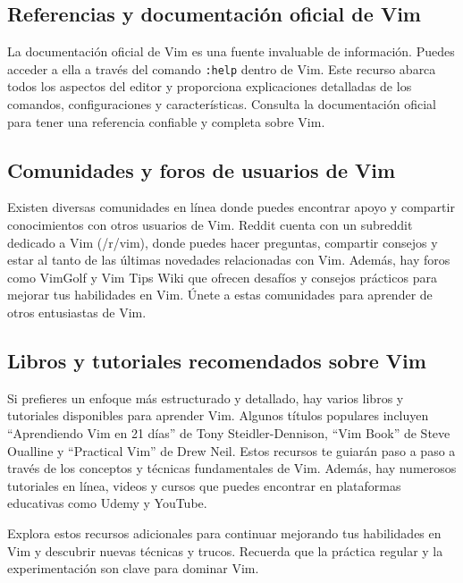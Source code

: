 \documentclass[
  doc,
  floatsintext,
  longtable,
  a4paper,
  nolmodern,
  notxfonts,
  notimes,
  colorlinks=true,linkcolor=blue,citecolor=blue,urlcolor=blue]{apa7}
\begin{document}
\subsection{Referencias y documentación oficial de
Vim}\label{referencias-y-documentaciuxf3n-oficial-de-vim}

La documentación oficial de Vim es una fuente invaluable de información.
Puedes acceder a ella a través del comando \texttt{:help} dentro de Vim.
Este recurso abarca todos los aspectos del editor y proporciona
explicaciones detalladas de los comandos, configuraciones y
características. Consulta la documentación oficial para tener una
referencia confiable y completa sobre Vim.

\subsection{Comunidades y foros de usuarios de
Vim}\label{comunidades-y-foros-de-usuarios-de-vim}

Existen diversas comunidades en línea donde puedes encontrar apoyo y
compartir conocimientos con otros usuarios de Vim. Reddit cuenta con un
subreddit dedicado a Vim (/r/vim), donde puedes hacer preguntas,
compartir consejos y estar al tanto de las últimas novedades
relacionadas con Vim. Además, hay foros como VimGolf y Vim Tips Wiki que
ofrecen desafíos y consejos prácticos para mejorar tus habilidades en
Vim. Únete a estas comunidades para aprender de otros entusiastas de
Vim.

\subsection{Libros y tutoriales recomendados sobre
Vim}\label{libros-y-tutoriales-recomendados-sobre-vim}

Si prefieres un enfoque más estructurado y detallado, hay varios libros
y tutoriales disponibles para aprender Vim. Algunos títulos populares
incluyen ``Aprendiendo Vim en 21 días'' de Tony Steidler-Dennison, ``Vim
Book'' de Steve Oualline y ``Practical Vim'' de Drew Neil. Estos
recursos te guiarán paso a paso a través de los conceptos y técnicas
fundamentales de Vim. Además, hay numerosos tutoriales en línea, videos
y cursos que puedes encontrar en plataformas educativas como Udemy y
YouTube.

Explora estos recursos adicionales para continuar mejorando tus
habilidades en Vim y descubrir nuevas técnicas y trucos. Recuerda que la
práctica regular y la experimentación son clave para dominar Vim.
\end{document}
